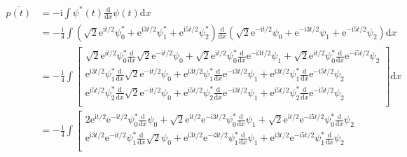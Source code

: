 \begin{equation}
    \begin{aligned}
        \overline{p(t)}&=-\mathrm{i}\int{\psi ^*(t)\frac{\mathrm{d}}{\mathrm{d}x}\psi (t)\mathrm{d}x}
\\
&=-\frac{\mathrm{i}}{4}\int{\left( \sqrt{2}\mathrm{e}^{\mathrm{i}t/2}\psi _{0}^{*}+\mathrm{e}^{\mathrm{i}3t/2}\psi _{1}^{*}+\mathrm{e}^{\mathrm{i}5t/2}\psi _{2}^{*} \right) \frac{\mathrm{d}}{\mathrm{d}x}\left( \sqrt{2}\mathrm{e}^{-\mathrm{i}t/2}\psi _0+\mathrm{e}^{-\mathrm{i}3t/2}\psi _1+\mathrm{e}^{-\mathrm{i}5t/2}\psi _2 \right) \mathrm{d}x}
\\
&=-\frac{\mathrm{i}}{4}\int{\left[ \begin{array}{c}
	\sqrt{2}\mathrm{e}^{\mathrm{i}t/2}\psi _{0}^{*}\frac{\mathrm{d}}{\mathrm{d}x}\sqrt{2}\mathrm{e}^{-\mathrm{i}t/2}\psi _0+\sqrt{2}\mathrm{e}^{\mathrm{i}t/2}\psi _{0}^{*}\frac{\mathrm{d}}{\mathrm{d}x}\mathrm{e}^{-\mathrm{i}3t/2}\psi _1+\sqrt{2}\mathrm{e}^{\mathrm{i}t/2}\psi _{0}^{*}\frac{\mathrm{d}}{\mathrm{d}x}\mathrm{e}^{-\mathrm{i}5t/2}\psi _2\\
	\mathrm{e}^{\mathrm{i}3t/2}\psi _{1}^{*}\frac{\mathrm{d}}{\mathrm{d}x}\sqrt{2}\mathrm{e}^{-\mathrm{i}t/2}\psi _0+\mathrm{e}^{\mathrm{i}3t/2}\psi _{1}^{*}\frac{\mathrm{d}}{\mathrm{d}x}\mathrm{e}^{-\mathrm{i}3t/2}\psi _1+\mathrm{e}^{\mathrm{i}3t/2}\psi _{1}^{*}\frac{\mathrm{d}}{\mathrm{d}x}\mathrm{e}^{-\mathrm{i}5t/2}\psi _2\\
	\mathrm{e}^{\mathrm{i}5t/2}\psi _{2}^{*}\frac{\mathrm{d}}{\mathrm{d}x}\sqrt{2}\mathrm{e}^{-\mathrm{i}t/2}\psi _0+\mathrm{e}^{\mathrm{i}5t/2}\psi _{2}^{*}\frac{\mathrm{d}}{\mathrm{d}x}\mathrm{e}^{-\mathrm{i}3t/2}\psi _1+\mathrm{e}^{\mathrm{i}5t/2}\psi _{2}^{*}\frac{\mathrm{d}}{\mathrm{d}x}\mathrm{e}^{-\mathrm{i}5t/2}\psi _2\\
\end{array} \right] \mathrm{d}x}
\\
&=-\frac{\mathrm{i}}{4}\int{\left[ \begin{array}{c}
	2\mathrm{e}^{\mathrm{i}t/2}\mathrm{e}^{-\mathrm{i}t/2}\psi _{0}^{*}\frac{\mathrm{d}}{\mathrm{d}x}\psi _0+\sqrt{2}\mathrm{e}^{\mathrm{i}t/2}\mathrm{e}^{-\mathrm{i}3t/2}\psi _{0}^{*}\frac{\mathrm{d}}{\mathrm{d}x}\psi _1+\sqrt{2}\mathrm{e}^{\mathrm{i}t/2}\mathrm{e}^{-\mathrm{i}5t/2}\psi _{0}^{*}\frac{\mathrm{d}}{\mathrm{d}x}\psi _2\\
	\mathrm{e}^{\mathrm{i}3t/2}\mathrm{e}^{-\mathrm{i}t/2}\psi _{1}^{*}\frac{\mathrm{d}}{\mathrm{d}x}\sqrt{2}\psi _0+\mathrm{e}^{\mathrm{i}3t/2}\mathrm{e}^{-\mathrm{i}3t/2}\psi _{1}^{*}\frac{\mathrm{d}}{\mathrm{d}x}\psi _1+\mathrm{e}^{\mathrm{i}3t/2}\mathrm{e}^{-\mathrm{i}5t/2}\psi _{1}^{*}\frac{\mathrm{d}}{\mathrm{d}x}\psi _2\\

\end{array}}
\end{aligned}
\end{equation}
